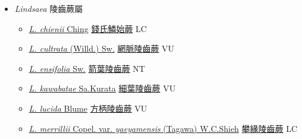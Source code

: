 
  \begin{itemize}
 \item[] \textit{Lindsaea} 陵齒蕨屬
                    
  \begin{itemize}
        \item[] \href{http://www.theplantlist.org/tpl1.1/search?q=Lindsaea+chienii}{\textit{L. chienii} Ching}   \href{\detokenize{http://taibnet.sinica.edu.tw/chi/taibnet_species_list.php?T2=錢氏鱗始蕨&T2_new_value=true&fr=y}}{錢氏鱗始蕨} LC
        \item[] \href{http://www.theplantlist.org/tpl1.1/search?q=Lindsaea+cultrata}{\textit{L. cultrata} (Willd.) Sw.}   \href{\detokenize{http://taibnet.sinica.edu.tw/chi/taibnet_species_list.php?T2=網脈陵齒蕨&T2_new_value=true&fr=y}}{網脈陵齒蕨} VU
        \item[] \href{http://www.theplantlist.org/tpl1.1/search?q=Lindsaea+ensifolia}{\textit{L. ensifolia} Sw.}   \href{\detokenize{http://taibnet.sinica.edu.tw/chi/taibnet_species_list.php?T2=箭葉陵齒蕨&T2_new_value=true&fr=y}}{箭葉陵齒蕨} NT
        \item[] \href{http://www.theplantlist.org/tpl1.1/search?q=Lindsaea+kawabatae}{\textit{L. kawabatae} Sa.Kurata}   \href{\detokenize{http://taibnet.sinica.edu.tw/chi/taibnet_species_list.php?T2=細葉陵齒蕨&T2_new_value=true&fr=y}}{細葉陵齒蕨} VU
        \item[] \href{http://www.theplantlist.org/tpl1.1/search?q=Lindsaea+lucida}{\textit{L. lucida} Blume}     \href{\detokenize{http://taibnet.sinica.edu.tw/chi/taibnet_species_list.php?T2=方柄陵齒蕨&T2_new_value=true&fr=y}}{方柄陵齒蕨} VU
        \item[] \href{http://www.theplantlist.org/tpl1.1/search?q=Lindsaea+merrillii+var.+yaeyamensis}{\textit{L. merrillii} Copel. var. \textit{yaeyamensis} (Tagawa) W.C.Shieh}   \href{\detokenize{http://taibnet.sinica.edu.tw/chi/taibnet_species_list.php?T2=攀緣陵齒蕨&T2_new_value=true&fr=y}}{攀緣陵齒蕨} LC

\end{itemize}
\end{itemize}
